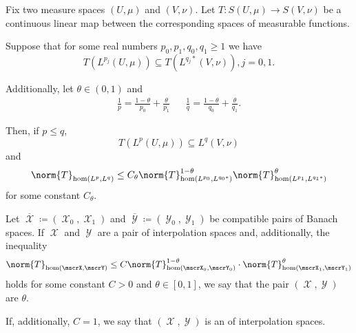 \begin{theorem}
  Fix two measure spaces \( (U, \mu) \) and \( (V, \nu) \). Let \( T: S(U, \mu) \to S(V, \nu) \) be a continuous linear map between the corresponding spaces of measurable functions.

  Suppose that for some real numbers \( p_0, p_1, q_0, q_1 \geq 1 \) we have
  \begin{equation*}
    T(L^{p_j}(U, \mu)) \subseteq T(L^{q_j *}(V, \nu)), j = 0, 1.
  \end{equation*}

  Additionally, let \( \theta \in (0, 1) \) and
  \begin{align*}
    \frac 1 p = \frac {1 - \theta} {p_0} + \frac {\theta} {p_1}
    &&
    \frac 1 q = \frac {1 - \theta} {q_0} + \frac {\theta} {q_1}.
  \end{align*}

  Then, if \( p \leq q \),
  \begin{equation*}
    T(L^p(U, \mu)) \subseteq L^q(V, \nu)
  \end{equation*}
  and
  \begin{equation*}
    \norm{T}_{\hom(L^p, L^q)} \leq C_\theta \norm{T}_{\hom(L^{p_0}, L^{q_0*})}^{1 - \theta} \norm{T}_{\hom(L^{p_1}, L^{q_1*})}^\theta
  \end{equation*}
  for some constant \( C_\theta \).
\end{theorem}

\begin{definition}\label{def:banach_interpolation_space_exponent}\mcite\cite[27]{Bergh1976}
  Let \( \overline{\mscrX} \coloneqq ( \mscrX_0, \mscrX_1 ) \) and \( \overline{\mscrY} \coloneqq ( \mscrY_0, \mscrY_1 ) \) be compatible pairs of Banach spaces. If \( \mscrX \) and \( \mscrY \) are a pair of interpolation spaces and, additionally, the inequality
  \begin{equation}\label{da:def:banach_interpolation_space_exponent}
    \norm{T}_{\hom(\mscrX, \mscrY)} \leq C \norm{T}_{\hom(\mscrX_0, \mscrY_0)}^{1-\theta} \cdot \norm{T}_{\hom(\mscrX_1, \mscrY_1)}^{\theta}
  \end{equation}
  holds for some constant \( C > 0 \) and \( \theta \in [0, 1] \), we say that the pair \( (\mscrX, \mscrY) \) are  \( \theta \).

  If, additionally, \( C = 1 \), we say that \( (\mscrX, \mscrY) \) is an  of interpolation spaces.
\end{definition}

